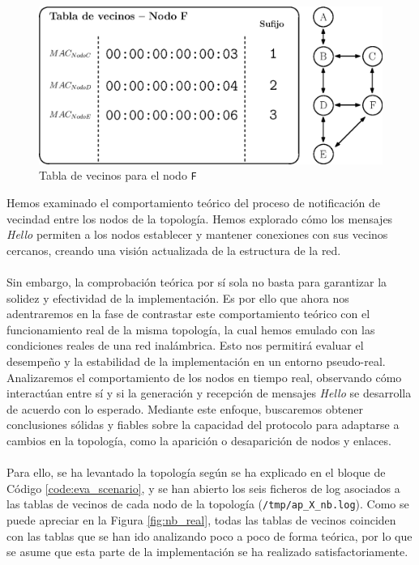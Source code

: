 \begin{figure}[ht!]
    \centering
    \includegraphics[width=\textwidth]{archivos/img/dev/topo_hello_nodoF_nb.eps}
    \caption{Tabla de vecinos para el nodo \texttt{F}}
    \label{fig:topo_hello_nodoF_nb}
\end{figure}


Hemos examinado el comportamiento teórico del proceso de notificación de vecindad entre los nodos de la topología. Hemos explorado cómo los mensajes \textit{Hello} permiten a los nodos establecer y mantener conexiones con sus vecinos cercanos, creando una visión actualizada de la estructura de la red.\\
\\
Sin embargo, la comprobación teórica por sí sola no basta para garantizar la solidez y efectividad de la implementación. Es por ello que ahora nos adentraremos en la fase de contrastar este comportamiento teórico con el funcionamiento real de la misma topología, la cual hemos emulado con las condiciones reales de una red inalámbrica. Esto nos permitirá evaluar el desempeño y la estabilidad de la implementación en un entorno pseudo-real. Analizaremos el comportamiento de los nodos en tiempo real, observando cómo interactúan entre sí y si la generación y recepción de mensajes \textit{Hello} se desarrolla de acuerdo con lo esperado. Mediante este enfoque, buscaremos obtener conclusiones sólidas y fiables sobre la capacidad del protocolo para adaptarse a cambios en la topología, como la aparición o desaparición de nodos y enlaces.\\
\\
Para ello, se ha levantado la topología según se ha explicado en el bloque de Código \ref{code:eva_scenario}, y se han abierto los seis ficheros de log asociados a las tablas de vecinos de cada nodo de la topología (\texttt{/tmp/ap\_X\_nb.log}). Como se puede apreciar en la Figura \ref{fig:nb_real}, todas las tablas de vecinos coinciden con las tablas que se han ido analizando poco a poco de forma teórica, por lo que se asume que esta parte de la implementación se ha realizado satisfactoriamente.

